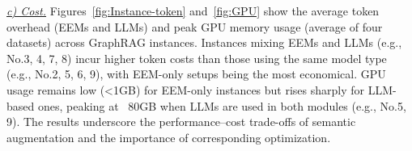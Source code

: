 {\it \underline{c) Cost.}} Figures~\ref{fig:Instance-token} and~\ref{fig:GPU} show the average token overhead (EEMs and LLMs) and peak GPU memory usage (average of four datasets) across GraphRAG instances. 
Instances mixing EEMs and LLMs (e.g., No.3, 4, 7, 8) incur higher token costs than those using the same model type (e.g., No.2, 5, 6, 9), with EEM-only setups being the most economical.
GPU usage remains low (<1GB) for EEM-only instances but rises sharply for LLM-based ones, peaking at ~80GB when LLMs are used in both modules (e.g., No.5, 9). The results underscore the performance–cost trade-offs of semantic augmentation and the importance of corresponding optimization.





